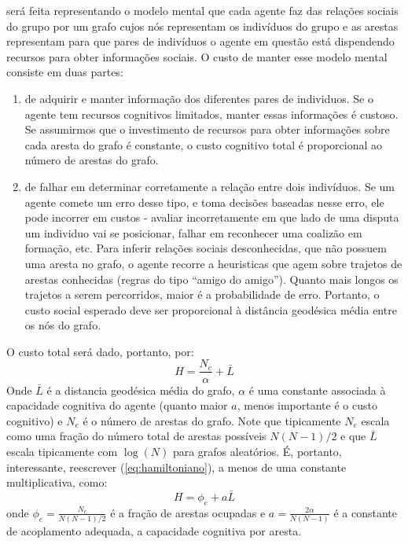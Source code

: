  será feita representando o modelo mental que cada agente faz das relações sociais do grupo por um grafo cujos nós representam os indivíduos do grupo e as arestas representam para que pares de indivíduos o agente em questão está dispendendo recursos para obter informações sociais. O custo de manter esse modelo mental consiste em duas partes:   
\begin{enumerate}
\item {} de adquirir e manter informação dos diferentes pares de individuos. Se o agente tem recursos cognitivos limitados, manter essas informações é custoso. Se assumirmos que o investimento de recursos para obter informações sobre cada aresta do grafo é constante, o custo cognitivo total é proporcional ao número de arestas do grafo.
\item {} de falhar em determinar corretamente a relação entre dois indivíduos. Se um agente comete um erro desse tipo, e toma decisões baseadas nesse erro, ele pode incorrer em custos - avaliar incorretamente em que lado de uma disputa um individuo vai se posicionar, falhar em reconhecer uma coalizão em formação, etc. Para inferir relações sociais desconhecidas, que não possuem uma aresta no grafo, o agente recorre a heuristicas que agem sobre trajetos de arestas conhecidas (regras do tipo ``amigo do amigo''). Quanto mais longos os trajetos a serem percorridos, maior é a probabilidade de erro. Portanto, o custo social esperado deve ser proporcional à distância geodésica média entre os nós do grafo.
\end{enumerate}
O custo total será dado, portanto, por:
\begin{equation}
   \label{eq:hamiltoniano}
   H = \frac{N_{e}}{\alpha}  + \bar{L}
\end{equation}
Onde $\bar{L}$ é a distancia geodésica média do grafo, $\alpha$ é uma constante associada à capacidade cognitiva do agente (quanto maior $a$, menos importante é o custo cognitivo) e $N_{e}$ é o número de arestas do grafo. Note que tipicamente \(N_{e}\) escala como uma fração do número total de arestas possíveis \(N(N-1)/2\) e que \(\bar{L}\) escala tipicamente com \(\log(N)\) para grafos aleatórios. É, portanto, interessante, reescrever (\ref{eq:hamiltoniano}), a menos de uma constante multiplicativa, como:
\begin{equation}
   \label{eq:hamiltoniano2}
   H = \phi_{e}  + a \bar{L}
\end{equation}
onde \(\phi_{e} = \frac{N_{e}}{N(N-1)/2}\) é a fração de arestas ocupadas e \(a = \frac{2\alpha}{N(N-1)}\) é a constante de acoplamento adequada, a capacidade cognitiva por aresta. 
